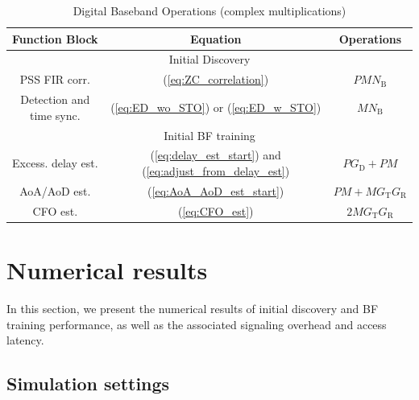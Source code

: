 \documentclass[journal]{IEEEtran}
\newcommand{\Nb}[0]{N_{\text{B}}}
\newcommand{\Gr}[0]{G_{\text{R}}}
\newcommand{\Gt}[0]{G_{\text{T}}}
\newcommand{\Gd}[0]{G_{\text{D}}}
\begin{document}
\begin{table}
\caption{Digital Baseband Operations (complex multiplications)}
\centering
\begin{tabular}{|c|c|c|}
\hline 
\textbf{Function Block} & \textbf{Equation}&\textbf{Operations}\tabularnewline
\hline 
\hline 
\multicolumn{3}{|c|}{Initial Discovery} \tabularnewline
\hline
PSS FIR corr. & (\ref{eq:ZC_correlation}) & $PM\Nb$ \tabularnewline
\hline
Detection and time sync. & (\ref{eq:ED_wo_STO}) or (\ref{eq:ED_w_STO}) & $M\Nb$ \tabularnewline
\hline
\multicolumn{3}{|c|}{Initial BF training} \tabularnewline
\hline
Excess. delay est. & (\ref{eq:delay_est_start}) and (\ref{eq:adjust_from_delay_est}) & $P\Gd +PM$ \tabularnewline
\hline
AoA/AoD est. & (\ref{eq:AoA_AoD_est_start}) & $PM+M\Gt\Gr$ \tabularnewline
\hline
CFO est. & (\ref{eq:CFO_est}) & $2M\Gt\Gr$ \tabularnewline
\hline
\end{tabular}
\vspace{-1mm}
\label{tab:operations}
\end{table}

% 
%
\section{Numerical results}
\label{sec:simulation results}
In this section, we present the numerical results of initial discovery and BF training performance, as well as the associated signaling overhead and access latency. 

% 
%
\subsection{Simulation settings}
\end{document}
